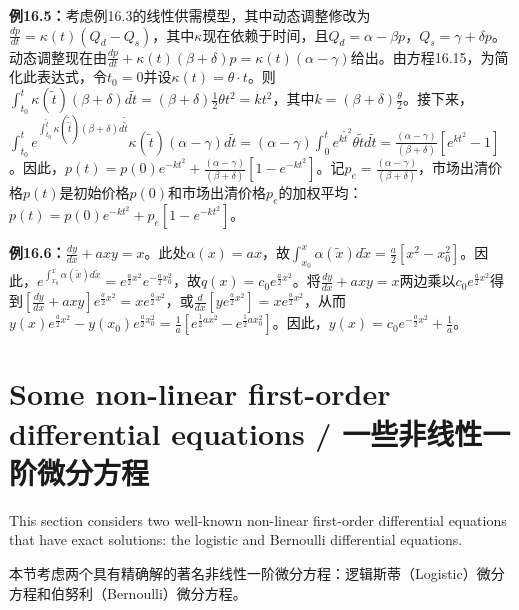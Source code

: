 \begin{translation}
\textbf{例16.5：}考虑例16.3的线性供需模型，其中动态调整修改为$\frac{dp}{dt} = \kappa(t)(Q_d - Q_s)$，其中$\kappa$现在依赖于时间，且$Q_d = \alpha - \beta p$，$Q_s = \gamma + \delta p$。动态调整现在由$\frac{dp}{dt} + \kappa(t)(\beta + \delta)p = \kappa(t)(\alpha - \gamma)$给出。由方程16.15，为简化此表达式，令$t_0 = 0$并设$\kappa(t) = \theta \cdot t$。则$\int_{t_0}^{t} \kappa(\tilde{t})(\beta + \delta)d\tilde{t} = (\beta + \delta)\frac{1}{2}\theta t^2 = kt^2$，其中$k = (\beta + \delta)\frac{\theta}{2}$。接下来，$\int_{t_0}^{t} e^{\int_{t_0}^{\tilde{t}} \kappa(\tilde{\tilde{t}})(\beta+\delta)d\tilde{\tilde{t}}} \kappa(\tilde{t})(\alpha - \gamma) d\tilde{t} = (\alpha - \gamma) \int_{0}^{t} e^{k\tilde{t}^2}\theta\tilde{t} d\tilde{t} = \frac{(\alpha - \gamma)}{(\beta + \delta)} [e^{k t^2} - 1]$。因此，$p(t) = p(0)e^{-k t^2} + \frac{(\alpha - \gamma)}{(\beta + \delta)}[1 - e^{-k t^2}]$。记$p_e = \frac{(\alpha - \gamma)}{(\beta + \delta)}$，市场出清价格$p(t)$是初始价格$p(0)$和市场出清价格$p_e$的加权平均：$p(t) = p(0)e^{-k t^2} + p_e[1 - e^{-k t^2}]$。

\textbf{例16.6：}$\frac{dy}{dx} + axy = x$。此处$\alpha(x) = ax$，故$\int_{x_0}^{x} \alpha(\tilde{x}) d\tilde{x} = \frac{a}{2}[x^2 - x_0^2]$。因此，$e^{\int_{x_0}^{x} \alpha(\tilde{x}) d\tilde{x}} = e^{\frac{a}{2}x^2} e^{-\frac{a}{2}x_0^2}$，故$q(x) = c_0 e^{\frac{a}{2}x^2}$。将$\frac{dy}{dx} + axy = x$两边乘以$c_0 e^{\frac{a}{2}x^2}$得到$[\frac{dy}{dx} + axy] e^{\frac{a}{2}x^2} = x e^{\frac{a}{2}x^2}$，或$\frac{d}{dx}[y e^{\frac{a}{2}x^2}] = x e^{\frac{a}{2}x^2}$，从而$y(x)e^{\frac{a}{2}x^2} - y(x_0)e^{\frac{a}{2}x_0^2} = \frac{1}{a}[e^{\frac{1}{2}ax^2} - e^{\frac{1}{2}a x_0^2}]$。因此，$y(x) = c_0 e^{-\frac{a}{2}x^2} + \frac{1}{a}$。
\end{translation}

\section{Some non-linear first-order differential equations / 一些非线性一阶微分方程}

\begin{original}
This section considers two well-known non-linear first-order differential equations that have exact solutions: the logistic and Bernoulli differential equations.
\end{original}
\begin{translation}
本节考虑两个具有精确解的著名非线性一阶微分方程：逻辑斯蒂（Logistic）微分方程和伯努利（Bernoulli）微分方程。
\end{translation}

